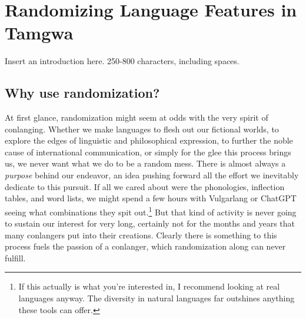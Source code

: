 \documentclass[a4paper,12pt,twoside,openright]{memoir}
\begin{document}


\chapter[Randomizing Language Features][Tamgwa]{Randomizing Language Features in Tamgwa}


\thispagestyle{fancy}
\BgUsetrue


Insert an introduction here. 250-800 characters, including spaces.

\section*{Why use randomization?} %

At first glance, randomization might seem at odds with the very spirit of conlanging.  Whether we make languages to flesh out our fictional worlds, to explore the edges of linguistic and philosophical expression, to further the noble cause of international communication, or simply for the glee this process brings us, we never want what we do to be a random mess.  There is almost always a \textit{purpose} behind our endeavor, an idea pushing forward all the effort we inevitably dedicate to this pursuit.  If all we cared about were the phonologies, inflection tables, and word lists, we might spend a few hours with Vulgarlang or ChatGPT seeing what combinations they spit out.\footnote{If this actually is what you're interested in, I recommend looking at real languages anyway.  The diversity in natural languages far outshines anything these tools can offer.}  But that kind of activity is never going to sustain our interest for very long, certainly not for the months and years that many conlangers put into their creations.  Clearly there is something to this process fuels the passion of a conlanger, which randomization along can never fulfill.
\end{document}
